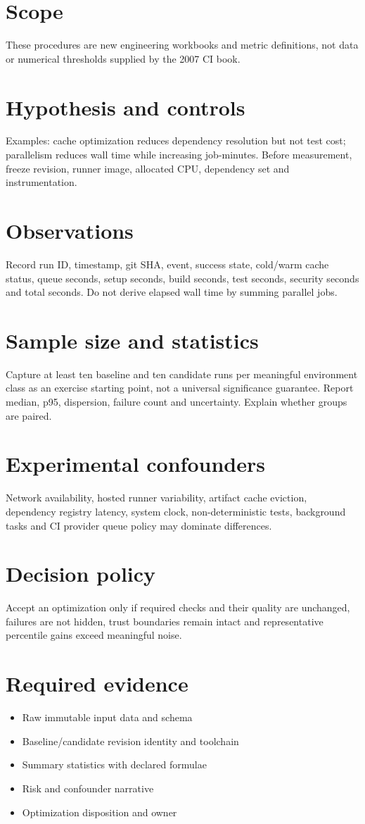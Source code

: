\documentclass[11pt,letterpaper]{article}
\begin{document}
\makedoctitle
\makedocsummary
\tableofcontents
\clearpage
\section{Scope}
These procedures are new engineering workbooks and metric definitions, not data or numerical thresholds supplied by the 2007 CI book.

\section{Hypothesis and controls}
Examples: cache optimization reduces dependency resolution but not test cost; parallelism reduces wall time while increasing job-minutes. Before measurement, freeze revision, runner image, allocated CPU, dependency set and instrumentation.

\section{Observations}
Record run ID, timestamp, git SHA, event, success state, cold/warm cache status, queue seconds, setup seconds, build seconds, test seconds, security seconds and total seconds. Do not derive elapsed wall time by summing parallel jobs.

\section{Sample size and statistics}
Capture at least ten baseline and ten candidate runs per meaningful environment class as an exercise starting point, not a universal significance guarantee. Report median, p95, dispersion, failure count and uncertainty. Explain whether groups are paired.

\section{Experimental confounders}
Network availability, hosted runner variability, artifact cache eviction, dependency registry latency, system clock, non-deterministic tests, background tasks and CI provider queue policy may dominate differences.

\section{Decision policy}
Accept an optimization only if required checks and their quality are unchanged, failures are not hidden, trust boundaries remain intact and representative percentile gains exceed meaningful noise.

\section{Required evidence}
\begin{itemize}
\item Raw immutable input data and schema
\item Baseline/candidate revision identity and toolchain
\item Summary statistics with declared formulae
\item Risk and confounder narrative
\item Optimization disposition and owner
\end{itemize}
\end{document}
